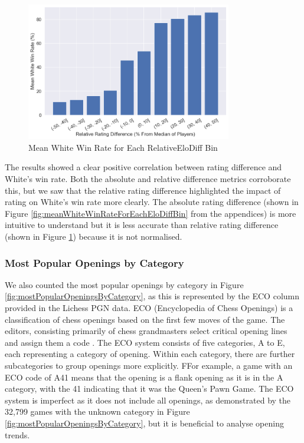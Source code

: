 \documentclass[a4paper, 11pt]{article}
\begin{document}
\begin{figure}[H]
    \centering
    \caption{Mean White Win Rate for Each RelativeEloDiff Bin}
    \label{fig:meanWhiteWinRateForEachRelativeEloDiffBin}
    \includegraphics[width=0.8\textwidth]{Mean White Win Rate for Each RelativeEloDiff Bin.png}
\end{figure}


The results showed a clear positive correlation between rating difference and White's win rate. Both the absolute and relative difference metrics corroborate this, but we saw that the relative rating difference highlighted the impact of rating on White's win rate more clearly. The absolute rating difference (shown in Figure \ref{fig:meanWhiteWinRateForEachEloDiffBin} from the appendices) is more intuitive to understand but it is less accurate than relative rating difference (shown in Figure \ref{fig:meanWhiteWinRateForEachRelativeEloDiffBin}) because it is not normalised.

\subsubsection{Most Popular Openings by Category}

We also counted the most popular openings by category in Figure \ref{fig:mostPopularOpeningsByCategory}, as this is represented by the ECO column provided in the Lichess PGN data. ECO (Encyclopedia of Chess Openings) is a classification of chess openings based on the first few moves of the game. The editors, consisting primarily of chess grandmasters select critical opening lines and assign them a code \cite{matanovic1971classification}. The ECO system consists of five categories, A to E, each representing a category of opening. Within each category, there are further subcategories to group openings more explicitly. FFor example, a game with an ECO code of A41 means that the opening is a flank opening as it is in the A category, with the 41 indicating that it was the Queen's Pawn Game. The ECO system is imperfect as it does not include all openings, as demonstrated by the 32,799 games with the unknown category in Figure \ref{fig:mostPopularOpeningsByCategory}, but it is beneficial to analyse opening trends.
\end{document}
